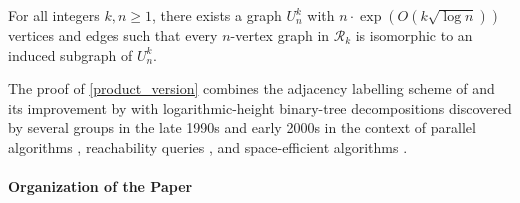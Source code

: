 \documentclass{patmorin}
\renewcommand{\ge}{\geqslant}
\newcommand{\Oh}{O}
\newcommand{\calR}{\mathcal{R}}
\begin{document}
\begin{thm}\label{product_version}
  For all integers $k,n\ge 1$, there exists a graph $U^k_n$ with $n\cdot \exp(\Oh(k\sqrt{\log n}))$ vertices and edges such that every $n$-vertex graph in $\calR_k$ is isomorphic to an induced subgraph of $U^k_n$.
\end{thm}

The proof of \cref{product_version} combines the adjacency labelling scheme of \citet{dujmovic.esperet.ea:adjacency} and its improvement by \citet{gawrychowski.janczewski:simpler} with logarithmic-height binary-tree decompositions discovered by several groups in the late 1990s and early 2000s in the context of parallel algorithms \cite{bodlaender.hagerup:parallel}, reachability queries \cite{chatterjee.ibsen-jensen.ea:optimal}, and space-efficient algorithms \cite{jain.tewari:space}. 

\paragraph{Organization of the Paper}
\end{document}
